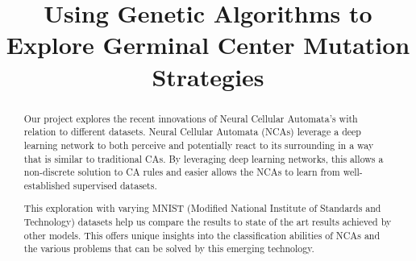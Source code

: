 \documentclass[conference]{IEEEtran}
\begin{document}
\title{Using Genetic Algorithms to Explore Germinal Center Mutation Strategies}

\author{
\and
{}
\and
{}
}

\maketitle

\begin{abstract}

% 
% 

Our project explores the recent innovations of Neural Cellular Automata's with relation to different datasets. Neural Cellular Automata (NCAs) leverage a deep learning network to both perceive and potentially react to its surrounding in a way that is similar to traditional CAs. By leveraging deep learning networks, this allows a non-discrete solution to CA rules and easier allows the NCAs to learn from well-established supervised datasets. 

This exploration with varying MNIST (Modified National Institute of Standards and Technology) datasets help us compare the results to state of the art results achieved by other models. This offers unique insights into the classification abilities of NCAs and the various problems that can be solved by this emerging technology.

\end{abstract}
\end{document}
